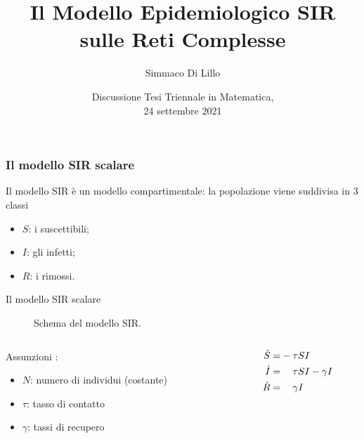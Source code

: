 \documentclass{beamer}
\title[Discussione Tesi Triennale]{Il Modello Epidemiologico SIR \\ sulle Reti Complesse}
\author{Simmaco Di Lillo}
\date[24 settembre 2021]{Discussione Tesi Triennale in Matematica,\\
24 settembre 2021}
\institute{Universit\`a di Pisa}
\newcommand{\spa}{\mathbin{\textcolor{white}{-}}}
\theoremstyle{definition}
\theoremstyle{plain}
\begin{document}
\begin{frame}
\titlepage
\end{frame}

\begin{frame}
\frametitle{Il modello SIR scalare}
    Il modello SIR \`e un modello compartimentale: la popolazione viene suddivisa in $3$ classi 
    \begin{itemize}
    \item $S$: i suscettibili;
    \item $I$: gli infetti;
    \item $R$: i rimossi.
    \end{itemize}
\end{frame}

\begin{frame}{Il modello SIR scalare}
\begin{figure}
\centering
{}
  \caption{Schema del modello SIR.}
   \end{figure}
    
  \begin{columns}
  \begin{column}{0.5\textwidth}
  Assunzioni :
  \begin{itemize}
  \item $N$: numero di individui  (costante)  \item $\tau$: tasso di contatto 
  \item $\gamma$: tassi di recupero
  \end{itemize}
  \end{column}
  \pause
  \begin{column}{0.5\textwidth}
  \begin{equation*}
  \begin{aligned}
      \dot{S} =& -\tau S I \\
      \dot{I} = & \spa \tau S I - \gamma I  \\
      \dot{R} = & \spa \gamma I 
      \end{aligned}
  \end{equation*}
  \end{column}
  \end{columns}
 
\end{frame}
\end{document}
